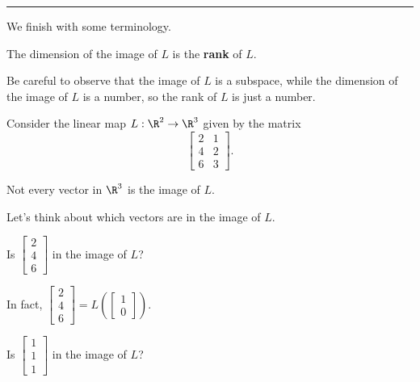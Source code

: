 \documentclass{ximera}
\begin{document}
\hrule

We finish with some terminology.

\begin{definition}
  The dimension of the image of $L$ is the \textbf{rank} of $L$.
\end{definition}

Be careful to observe that the image of $L$ is a subspace, while the dimension of the image of $L$
is a number, so the rank of $L$ is just a number.

\begin{question}
  Consider the linear map $L : \R^2 \to \R^3$ given by the matrix
  $$
  \begin{bmatrix}
    2 & 1 \\
    4 & 2 \\
    6 & 3
  \end{bmatrix}.
  $$
  
  \begin{solution}
    \begin{hint}
      Not every vector in $\R^3$ is the image of $L$.
    \end{hint}

    \begin{hint}
      Let's think about which vectors are in the image of $L$.

      \begin{question}
        Is $\begin{bmatrix} 2 \\ 4 \\ 6 \end{bmatrix}$ in the image of $L$?

        \begin{solution}
          \begin{multiple-choice}
          \end{multiple-choice}
        \end{solution}

        In fact, $\begin{bmatrix} 2 \\ 4 \\ 6 \end{bmatrix} = L \left( \begin{bmatrix} 1 \\ 0 \end{bmatrix} \right)$.

        Is $\begin{bmatrix} 1 \\ 1 \\ 1 \end{bmatrix}$ in the image of $L$?


\end{question}
\end{hint}
\end{solution}
\end{question}
\end{document}
